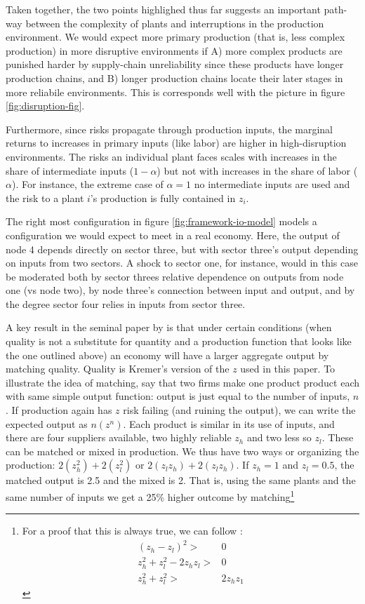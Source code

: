 \documentclass[11pt]{article}
\begin{document}
Taken together, the two points highlighed thus far suggests an important path-way between the complexity of plants and interruptions in the production environment.  We would expect more primary production (that is, less complex production) in more disruptive environments if A) more complex products are punished harder by supply-chain unreliability since these products have longer production chains, and B) longer production chains locate their later stages in more reliabile environments. This is corresponds well with the picture in figure \ref{fig:disruption-fig}. 

Furthermore, since risks propagate through production inputs, the marginal returns to increases in primary inputs (like labor) are higher in high-disruption environments. The risks an individual plant faces scales with increases in the share of intermediate inputs (\(1 - \alpha\)) but not with increases in the share of labor (\(\alpha\)). For instance, the extreme case of \(\alpha = 1\) no intermediate inputs are used and the risk to a plant \(i\)'s production is fully contained in \(z_i\). 

The right most configuration in figure \ref{fig:framework-io-model} models a configuration we would expect to meet in a real economy. Here, the output of node 4 depends directly on sector three, but with sector three's output depending on inputs from two sectors. A shock to sector one, for instance, would in this case be moderated both by sector threes relative dependence on outputs from node one (vs node two), by node three's connection between input and output, and by the degree sector four relies in inputs from sector three.

A key result in the seminal paper by \cite{kremer_o-ring_1993} is that under certain conditions (when quality is not a substitute for quantity and a production function that looks like the one outlined above) an economy will have a larger aggregate output by matching quality. Quality is Kremer's version of the \(z\) used in this paper. To illustrate the idea of matching, say that two firms make one product product each with same simple output function: output is just equal to the number of inputs, $n$. If production again has $z$ risk failing (and ruining the output), we can write the expected output as $n(z^n)$. Each product is similar in its use of inputs, and there are four suppliers available, two highly reliable \(z_{h}\) and two less so \(z_{l}\). These can be matched or mixed in production. We thus have two ways or organizing the production: $2(z_h^2) + 2(z_l^2)$ or $2(z_l z_h) + 2(z_l z_h)$. If $z_h = 1$ and $z_l = 0.5$, the matched output is 2.5 and the mixed is 2. That is, using the same plants and the same number of inputs we get a 25\% higher outcome by matching\footnote{For a proof that this is always true, we can follow \cite{kremer_o-ring_1993}:
\begin{align*}
	(z_h - z_l)^2 >& 0 \\  z_h^2 + z_l^2 - 2z_h z_l >& 0 \\ z_h^2 + z_l^2 >& 2z_h z_1
\end{align*}}
\end{document}
